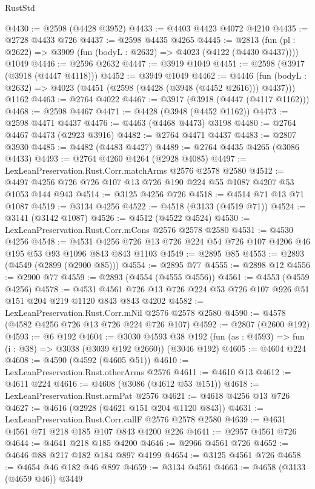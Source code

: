 \begin{lexlean}{RustStd}
\begin{coremodule}
@4430 := @2598 (@4428 @3952)
@4433 := @4403 @4423 @4072 @4210
@4435 := @2728 @4433 @726
@4437 := @2598 @4435 @4265
@4445 := @2813
    (fun (pl : @2622) => @3909 (fun (bodyL : @2632) => @4023 (@4122 (@4430 @4437))))
    @1049
@4446 := @2596 @2632
@4447 := @3919 @1049
@4451 := @2598 (@3917 (@3918 (@4447 @4118)))
@4452 := @3949 @1049
@4462 := @4446
    (fun (bodyL : @2632) => @4023 (@4451 (@2598 (@4428 (@3948 (@4452 @2616))) @4437)))
    @1162
@4463 := @2764 @4022
@4467 := @3917 (@3918 (@4447 (@4117 @1162)))
@4468 := @2598 @4467
@4471 := @4428 (@3948 (@4452 @1162))
@4473 := @2598 @4471 @4437
@4476 := @4463 (@4468 @4473) @3198
@4480 := @2764 @4467 @4473 (@2923 @3916)
@4482 := @2764 @4471 @4437
@4483 := @2807 @3930
@4485 := @4482 (@4483 @4427)
@4489 := @2764 @4435 @4265 (@3086 @4433)
@4493 := @2764 @4260 @4264 (@2928 @4085)
@4497 := LexLeanPreservation.Rust.Corr.matchArms @2576 @2578 @2580
@4512 := @4497 @4256 @726 @726 @107 @13 @726 @190 @224 @55 @1087 @4207 @53 @1053 @144 @943
@4514 := @3125 @4256 @726
@4518 := @4514 @71 @13 @71 @1087
@4519 := @3134 @4256
@4522 := @4518 (@3133 (@4519 @71))
@4524 := @3141 (@3142 @1087)
@4526 := @4512 (@4522 @4524)
@4530 := LexLeanPreservation.Rust.Corr.mCons @2576 @2578 @2580
@4531 := @4530 @4256
@4548 := @4531 @4256 @726 @13 @726 @224 @54 @726 @107 @4206 @46 @195 @53 @93 @1096 @843 @843 @1103
@4549 := @2895 @85
@4553 := @2893 (@4549 (@2899 (@2900 @85)))
@4554 := @2895 @77
@4555 := @2898 @12
@4556 := @2900 @77
@4559 := @2893 (@4554 (@4555 @4556))
@4561 := @4553 (@4559 @4256)
@4578 := @4531 @4561 @726 @13 @726 @224 @53 @726 @107 @926 @51 @151 @204 @219 @1120 @843 @843 @4202
@4582 := LexLeanPreservation.Rust.Corr.mNil @2576 @2578 @2580
@4590 := @4578 (@4582 @4256 @726 @13 @726 @224 @726 @107)
@4592 := @2807 (@2600 @192)
@4593 := @6 @192
@4604 := @3030
    @4593
    @38
    @192
    (fun (as : @4593) => fun (i : @38) => @3038 (@3039 @192 @2660))
    (@3046 @192)
@4605 := @4604 @224
@4608 := @4590 (@4592 (@4605 @51))
@4610 := LexLeanPreservation.Rust.otherArms @2576
@4611 := @4610 @13
@4612 := @4611 @224
@4616 := @4608 (@3086 (@4612 @53 @151))
@4618 := LexLeanPreservation.Rust.armPat @2576
@4621 := @4618 @4256 @13 @726
@4627 := @4616 (@2928 (@4621 @151 @204 @1120 @843))
@4631 := LexLeanPreservation.Rust.Corr.callF @2576 @2578 @2580
@4639 := @4631 @4561 @71 @218 @185 @107 @843 @4200 @226
@4641 := @2957 @4561 @726
@4644 := @4641 @218 @185 @4200
@4646 := @2966 @4561 @726
@4652 := @4646 @88 @217 @182 @184 @897 @4199
@4654 := @3125 @4561 @726
@4658 := @4654 @46 @182 @46 @897
@4659 := @3134 @4561
@4663 := @4658 (@3133 (@4659 @46)) @3449

\end{coremodule}
\end{lexlean}
